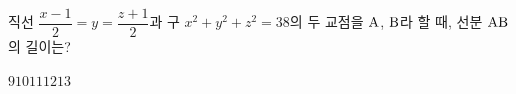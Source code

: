 직선 $\dfrac{x-1}{2}=y=\dfrac{z+1}{2}$과 구 $x^2+y^2+z^2=38$의 두 교점을 $\mathrm{A}$, $\mathrm{B}$라 할 때, 선분 $\mathrm{AB}$의 길이는?
\begin{choices32}{$9$}{$10$}{$11$}{$12$}{$13$}\end{choices32}
